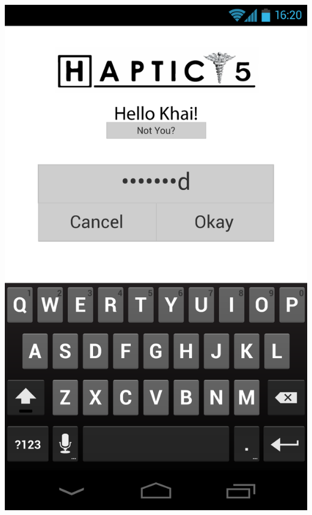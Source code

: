 \documentclass[pdftex,12pt,a4paper]{report}
\begin{document}
\begin{center}
	\includegraphics[scale=0.18]{Screens/00-Lock--Password-Entry.png}
	

\end{center}
\end{document}
